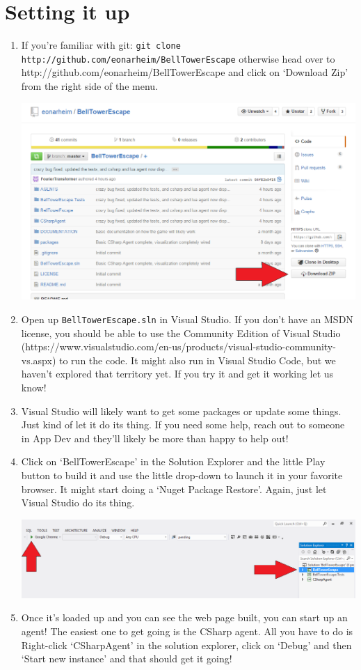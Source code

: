 \documentclass{article}
\begin{document}
\section*{Setting it up}
\begin{enumerate}
\item If you're familiar with git: \verb|git clone http://github.com/eonarheim/BellTowerEscape| otherwise head over to http://github.com/eonarheim/BellTowerEscape and click on `Download Zip' from the right side of the menu.

\includegraphics[width=6.5in]{1-DownloadZip.png}

\item Open up \verb|BellTowerEscape.sln| in Visual Studio. If you don't have an MSDN license, you should be able to use the Community Edition of Visual Studio (https://www.visualstudio.com/en-us/products/visual-studio-community-vs.aspx) to run the code. It might also run in Visual Studio Code, but we haven't explored that territory yet. If you try it and get it working let us know!

\item Visual Studio will likely want to get some packages or update some things. Just kind of let it do its thing. If you need some help, reach out to someone in App Dev and they'll likely be more than happy to help out!

\item Click on `BellTowerEscape' in the Solution Explorer and the little Play button to build it and use the little drop-down to launch it in your favorite browser. It might start doing a `Nuget Package Restore'. Again, just let Visual Studio do its thing.

\includegraphics[width=6.5in]{4-BuildIt.png}
\newpage
\item Once it's loaded up and you can see the web page built, you can start up an agent! The easiest one to get going is the CSharp agent. All you have to do is Right-click `CSharpAgent' in the solution explorer, click on `Debug' and then `Start new instance' and that should get it going!


\end{enumerate}
\end{document}
